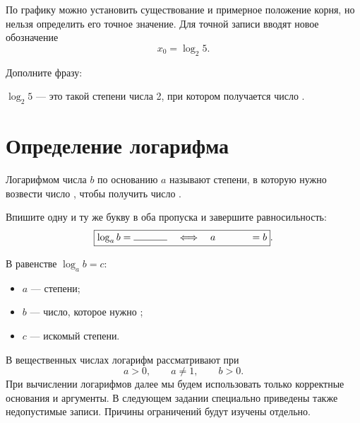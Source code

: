 По графику можно установить существование и примерное положение корня,
но нельзя определить его точное значение. Для точной записи вводят новое
обозначение
\[
  x_0=\log_2 5.
\]

\begin{reflectionbox}
  Дополните фразу:

  \(\log_2 5\) --- это такой \answerblank[34mm] степени числа 2,
  при котором получается число \answerblank[14mm].
\end{reflectionbox}

\section{Определение логарифма}

\begin{fillbox}
  Логарифмом числа \(b\) по основанию \(a\) называют
  \answerblank[42mm] степени, в которую нужно возвести число
  \answerblank[14mm], чтобы получить число \answerblank[14mm].
\end{fillbox}

\logequivalenceworksheetfigure

\begin{checkpointbox}
  Впишите одну и ту же букву в оба пропуска и завершите равносильность:
  \[
    \boxed{
      \log_a b=\answerblank[12mm]
      \quad\Longleftrightarrow\quad
      a^{\answerfraction[12mm]}=b
    }.
  \]
\end{checkpointbox}

\begin{fillbox}
  В равенстве \(\log_a b=c\):
  \begin{itemize}
    \item \(a\) --- \answerblank[35mm] степени;
    \item \(b\) --- число, которое нужно \answerblank[38mm];
    \item \(c\) --- искомый \answerblank[35mm] степени.
  \end{itemize}
\end{fillbox}

\begin{notebox}
  В вещественных числах логарифм рассматривают при
  \[
    a>0,\qquad a\ne1,\qquad b>0.
  \]
  При вычислении логарифмов далее мы будем использовать только корректные
  основания и аргументы. В следующем задании специально приведены также
  недопустимые записи. Причины ограничений будут изучены отдельно.
\end{notebox}


